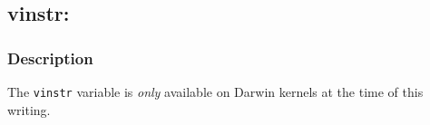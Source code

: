 \clearpage
{}
{}
\label{vars:vinstr}
\subsection*{vinstr: }

\subsubsection*{Description}

The \verb|vinstr| variable is \emph{only} available on Darwin kernels
at the time of this writing.

